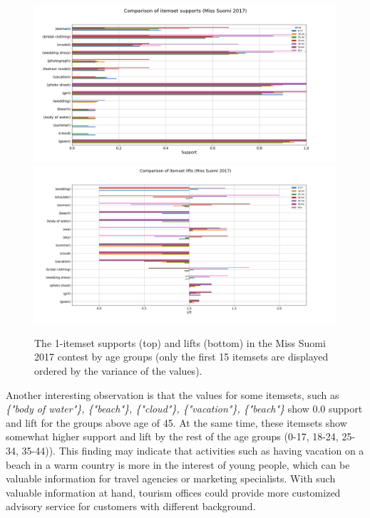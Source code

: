 \begin{figure}[] 
    \begin{center}
        \includegraphics[width=1.0\textwidth]{Images/itemset_supports-age_group-Miss_Helsinki-1_itemset.png}
        \includegraphics[width=1.0\textwidth]{Images/itemset_lifts-age_group-Miss_Suomi-1_itemsets.png}
        \caption{The 1-itemset supports (top) and lifts (bottom) in the Miss Suomi 2017 contest by age groups (only the first 15 itemsets are displayed ordered by the variance of the values).}
        \label{itemset_supports-age_group-Miss_Helsinki-1_itemset}
    \end{center}
\end{figure}

Another interesting observation is that the values for some itemsets, such as \emph{\{"body of water"\}, \{"beach"\}, \{"cloud"\}, \{"vacation"\}, \{"beach"\}} show 0.0 support and lift for the groups above age of 45. At the same time, these itemsets show somewhat higher support and lift by the rest of the age groups (0-17, 18-24, 25-34, 35-44)). This finding may indicate that activities such as having vacation on a beach in a warm country is more in the interest of young people, which can be valuable information for travel agencies or marketing specialists. With such valuable information at hand, tourism offices could provide more customized advisory service for customers with different background. 

